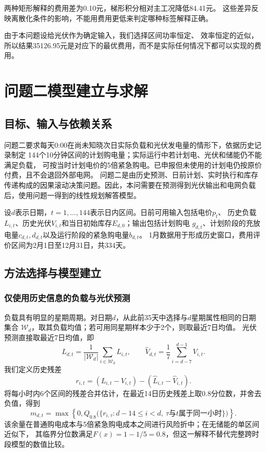 \documentclass[UTF8,a4paper,12pt]{ctexart}
\begin{document}
两种矩形解释的费用差为0.10元，梯形积分相对主工况降低84.41元。
这些差异反映离散化条件的影响，不能用费用更低来判定哪种标签解释正确。

由于本问题设给光伏作为确定输入，我们选择区间功率恒定、
效率恒定的近似，所以结果35126.95元是对应下的最优费用，而不是实际任何情况下都可以实现的费用。

\section{问题二模型建立与求解}
\subsection{目标、输入与依赖关系}
问题二要求每天0:00在尚未知晓次日实际负载和光伏发电量的情形下，依据历史记录制定
144个10分钟区间的计划购电量；实际运行中若计划电、光伏和储能仍不能满足负载，
可按当时计划电价的5倍紧急购电。已申报但未使用的计划电仍按原价付费，且不会退回外部电网。
问题二是由历史预测、日前计划、实时执行和库存传递构成的因果滚动决策问题。因此，本问需要在预测得到光伏输出和电网负载后，使用问题一得到的线性规划解答模型。

设$d$表示日期，$t=1,\ldots,144$表示日内区间。日前可用输入包括电价$p_t$、
历史负载$L_{i,t}$、历史光伏$V_{i,t}$和当日初始库存$E_{d,0}$；输出包括计划购电
$g_{d,t}$、计划阶段的充放电量$c_{d,t},d_{d,t}$以及运行阶段的紧急购电量$b_{d,t}$。
1月数据用于形成历史窗口，费用评价区间为2月1日至12月31日，共334天。

\subsection{方法选择与模型建立}
\subsubsection{仅使用历史信息的负载与光伏预测}
负载具有明显的星期周期。对日期$d$，从此前35天中选择与$d$星期属性相同的日期集合
$\mathcal W_d$，取其负载均值；若可用同星期样本少于2个，则取最近7日均值。
光伏预测直接取最近7日均值，即
\begin{equation}
 \widehat L_{d,t}=\frac{1}{|\mathcal W_d|}\sum_{i\in\mathcal W_d}L_{i,t},\qquad
 \widehat V_{d,t}=\frac{1}{7}\sum_{i=d-7}^{d-1}V_{i,t}.
 \label{eq:q2forecast}
\end{equation}
我们定义历史残差
\begin{equation}
 r_{i,t}=(L_{i,t}-V_{i,t})-(\widehat L_{i,t}-\widehat V_{i,t}).
\end{equation}
将每小时内6个区间的残差合并估计，在最近14日历史残差上取0.8分位数，并舍去负值，得到
\begin{equation}
 m_{d,t}=\max\left\{0,Q_{0.8}\bigl(\{r_{i,\tau}:d-14\le i<d,
 \ \tau\text{与}t\text{属于同一小时}\}\bigr)\right\}.
 \label{eq:q2margin}
\end{equation}
该余量在普通购电成本与5倍紧急购电成本之间进行风险折中；在无储能的单区间近似下，
其临界分位数满足$F(x)=1-1/5=0.8$，但这一解释不替代完整跨时段模型的数值比较。
\end{document}
